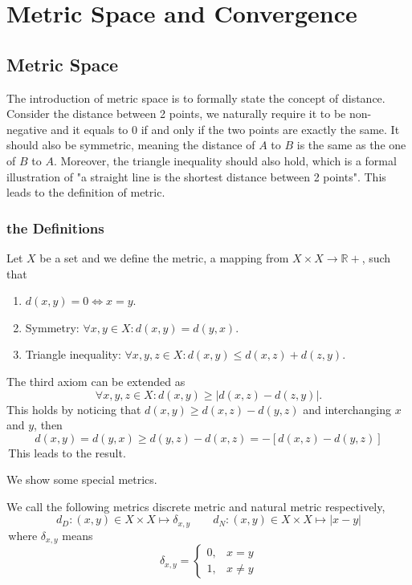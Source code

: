 \chapter{Metric Space and Convergence}
\section{Metric Space}
The introduction of metric space is to formally state the concept of distance. Consider the distance between 2 points, we naturally require 
it to be non-negative and it equals to 0 if and only if the two points are exactly the same. It should also be symmetric, meaning the distance of $A$ to $B$ is the same as the one of $B$ to $A$.
Moreover, the triangle inequality should also hold, which is a formal illustration of "a straight line is the shortest distance between 2 points". This leads to the definition of metric.
\subsection{the Definitions}
\begin{definition}
    Let $X$ be a set and we define the metric, a mapping from $X\times X \to \mathbb{R}+$, such that 
    \begin{enumerate}
        \item $d(x,y) = 0 \iff x = y.$
        \item Symmetry: $\forall x,y \in X : d(x,y) = d(y,x).$
        \item Triangle inequality: $\forall x,y,z \in X :d(x,y) \leq d(x,z)+d(z,y).$
    \end{enumerate}
\end{definition}
\begin{remark}
    The third axiom can be extended as $$\forall x,y,z \in X :d(x,y) \geq |d(x,z)-d(z,y)|.$$
    This holds by noticing that $d(x,y) \geq d(x,z) - d(y,z)$ and interchanging $x$ and $y$, then
    $$d(x,y) = d(y,x) \geq d(y,z) - d(x,z) = - [d(x,z) - d(y,z)]$$
    \,This leads to the result.
\end{remark}

We show some special metrics.
\begin{example}
    We call the following metrics discrete metric and natural metric respectively,
    $$d_D : (x,y) \in X\times X \mapsto \delta_{x,y} \qquad d_N : (x,y) \in X\times X \mapsto |x-y|$$
    \,where $\delta_{x,y}$ means
    $$\delta_{x,y} = \begin{cases}
        0, & x=y \\
        1, & x\neq y
    \end{cases}$$
\end{example}

